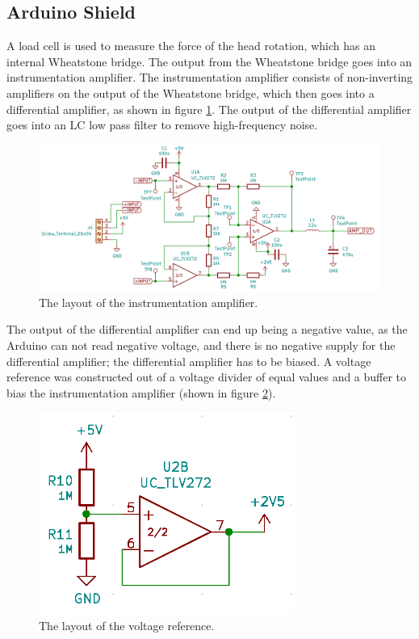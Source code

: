 \documentclass[twoside]{article}
\begin{document}
    \subsection{Arduino Shield}
        A load cell is used to measure the force of the head rotation, which has an internal Wheatstone bridge. The output from the Wheatstone bridge goes into an instrumentation amplifier. The instrumentation amplifier consists of non-inverting amplifiers on the output of the Wheatstone bridge, which then goes into a differential amplifier, as shown in figure \ref{fig:inamp}. The output of the differential amplifier goes into an LC low pass filter to remove high-frequency noise.
        \noindent
        \begin{figure}[H]
            \centering
            \includegraphics[width=\textwidth]{inamp.png}
            \caption{The layout of the instrumentation amplifier.}
            \label{fig:inamp}
        \end{figure}
        The output of the differential amplifier can end up being a negative value, as the Arduino can not read negative voltage, and there is no negative supply for the differential amplifier; the differential amplifier has to be biased. A voltage reference was constructed out of a voltage divider of equal values and a buffer to bias the instrumentation amplifier (shown in figure \ref{fig:vref}).
        \noindent
        \begin{figure}[H]
            \centering
            \includegraphics[width=0.75\textwidth]{vref.png}
            \caption{The layout of the voltage reference.}
            \label{fig:vref}
        \end{figure}
\end{document}
